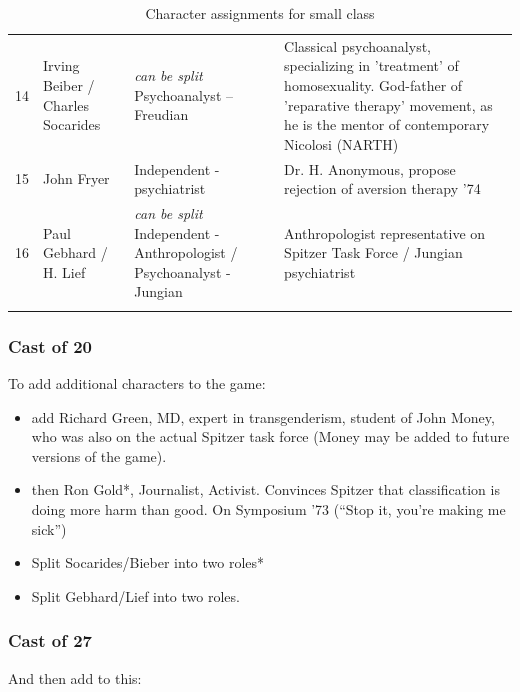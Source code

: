 \begin{longtable}[!t]{ | p{0.6cm} | P{3.4cm} | P{5cm} | P{6.5cm} | }
14&
Irving Beiber / Charles Socarides&
\emph{can be split} \newline
Psychoanalyst – Freudian&
Classical psychoanalyst, specializing in 'treatment' of homosexuality. God-father of 'reparative therapy' movement, as he is the mentor of contemporary Nicolosi (NARTH) \\
15&
John Fryer&
Independent - psychiatrist&
Dr. H. Anonymous, propose rejection of aversion therapy '74\\
16&
Paul Gebhard / H. Lief&
\emph{can be split}\newline
Independent - Anthropologist / Psychoanalyst - Jungian&
Anthropologist representative on Spitzer Task Force / Jungian psychiatrist\\ \hline

\caption{Character assignments for small class}
\label{table: charactersmall}
\end{longtable}

\subsubsection{Cast of 20}
\label{castof20}

To add additional characters to the game:

\begin{itemize}
\item add Richard Green, MD, expert in transgenderism, student of John Money, who was also on the actual Spitzer task force (Money may be added to future versions of the game).

\item then Ron Gold*, Journalist, Activist. Convinces Spitzer that classification is doing more harm than good. On Symposium '73 (``Stop it, you're making me sick'')

\item Split Socarides\slash  Bieber into two roles*

\item Split Gebhard\slash  Lief into two roles.

\end{itemize}

\subsubsection{Cast of 27}
\label{castof27}

And then add to this:

